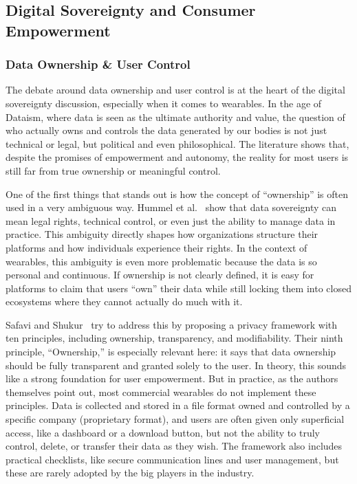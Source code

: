 \subsection{Digital Sovereignty and Consumer Empowerment}
	\subsubsection{Data Ownership \& User Control}

	The debate around data ownership and user control is at the heart of the digital sovereignty discussion, especially when it comes to wearables. In the age of Dataism, where data is seen as the ultimate authority and value, the question of who actually owns and controls the data generated by our bodies is not just technical or legal, but political and even philosophical. The literature shows that, despite the promises of empowerment and autonomy, the reality for most users is still far from true ownership or meaningful control.

	One of the first things that stands out is how the concept of “ownership” is often used in a very ambiguous way. Hummel et al.~\cite{Hummel2021} show that data sovereignty can mean legal rights, technical control, or even just the ability to manage data in practice. This ambiguity directly shapes how organizations structure their platforms and how individuals experience their rights. In the context of wearables, this ambiguity is even more problematic because the data is so personal and continuous. If ownership is not clearly defined, it is easy for platforms to claim that users “own” their data while still locking them into closed ecosystems where they cannot actually do much with it.

	Safavi and Shukur~\cite{Safavi2014} try to address this by proposing a privacy framework with ten principles, including ownership, transparency, and modifiability. Their ninth principle, “Ownership,” is especially relevant here: it says that data ownership should be fully transparent and granted solely to the user. In theory, this sounds like a strong foundation for user empowerment. But in practice, as the authors themselves point out, most commercial wearables do not implement these principles. Data is collected and stored in a file format owned and controlled by a specific company (proprietary format), and users are often given only superficial access, like a dashboard or a download button, but not the ability to truly control, delete, or transfer their data as they wish. The framework also includes practical checklists, like secure communication lines and user management, but these are rarely adopted by the big players in the industry.

